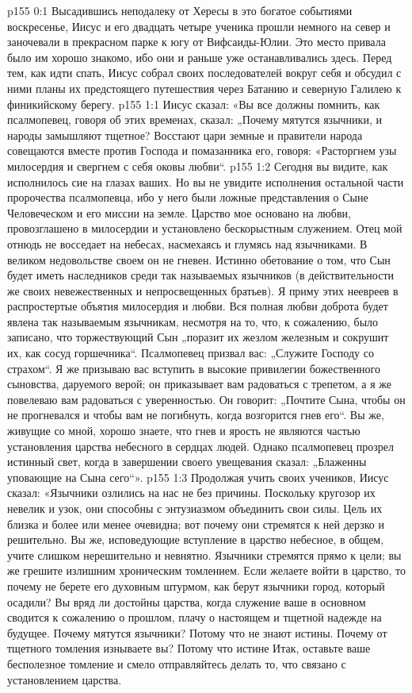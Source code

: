 \author{Комиссия срединников}
\vs p155 0:1 Высадившись неподалеку от Хересы в это богатое событиями воскресенье, Иисус и его двадцать четыре ученика прошли немного на север и заночевали в прекрасном парке к югу от Вифсаиды\hyp{}Юлии. Это место привала было им хорошо знакомо, ибо они и раньше уже останавливались здесь. Перед тем, как идти спать, Иисус собрал своих последователей вокруг себя и обсудил с ними планы их предстоящего путешествия через Батанию и северную Галилею к финикийскому берегу.
\vs p155 1:1 Иисус сказал: «Вы все должны помнить, как псалмопевец, говоря об этих временах, сказал: „Почему мятутся язычники, и народы замышляют тщетное? Восстают цари земные и правители народа совещаются вместе против Господа и помазанника его, говоря: «Расторгнем узы милосердия и свергнем с себя оковы любви“.
\vs p155 1:2 Сегодня вы видите, как исполнилось сие на глазах ваших. Но вы не увидите исполнения остальной части пророчества псалмопевца, ибо у него были ложные представления о Сыне Человеческом и его миссии на земле. Царство мое основано на любви, провозглашено в милосердии и установлено бескорыстным служением. Отец мой отнюдь не восседает на небесах, насмехаясь и глумясь над язычниками. В великом недовольстве своем он не гневен. Истинно обетование о том, что Сын будет иметь наследников среди так называемых язычников (в действительности же своих невежественных и непросвещенных братьев). Я приму этих неевреев в распростертые объятия милосердия и любви. Вся полная любви доброта будет явлена так называемым язычникам, несмотря на то, что, к сожалению, было записано, что торжествующий Сын „поразит их жезлом железным и сокрушит их, как сосуд горшечника“. Псалмопевец призвал вас: „Служите Господу со страхом“. Я же призываю вас вступить в высокие привилегии божественного сыновства, даруемого верой; он приказывает вам радоваться с трепетом, а я же повелеваю вам радоваться с уверенностью. Он говорит: „Почтите Сына, чтобы он не прогневался и чтобы вам не погибнуть, когда возгорится гнев его“. Вы же, живущие со мной, хорошо знаете, что гнев и ярость не являются частью установления царства небесного в сердцах людей. Однако псалмопевец прозрел истинный свет, когда в завершении своего увещевания сказал: „Блаженны уповающие на Сына сего“».
\vs p155 1:3 Продолжая учить своих учеников, Иисус сказал: «Язычники озлились на нас не без причины. Поскольку кругозор их невелик и узок, они способны с энтузиазмом объединить свои силы. Цель их близка и более или менее очевидна; вот почему они стремятся к ней дерзко и решительно. Вы же, исповедующие вступление в царство небесное, в общем, учите слишком нерешительно и невнятно. Язычники стремятся прямо к цели; вы же грешите излишним хроническим томлением. Если желаете войти в царство, то почему не берете его духовным штурмом, как берут язычники город, который осадили? Вы вряд ли достойны царства, когда служение ваше в основном сводится к сожалению о прошлом, плачу о настоящем и тщетной надежде на будущее. Почему мятутся язычники? Потому что не знают истины. Почему от тщетного томления изнываете вы? Потому что истине  Итак, оставьте ваше бесполезное томление и смело отправляйтесь делать то, что связано с установлением царства.

